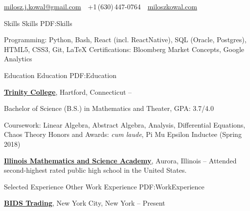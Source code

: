 \documentclass[letterpaper,MMMyyyy,nonstopmode]{simpleresumecv}
\newcommand{\CVAuthor}{Milosz Kowal}
\newcommand{\CVWebpage}{https://miloszkowal.com}
\begin{document}

\Title{\CVAuthor}

\begin{SubTitle}
\par
\href{mailto:milosz.j.kowal@gmail.com}
{milosz.j.kowal@gmail.com}
\,\SubBulletSymbol\,
+1\,(630)\,447-0764
\,\SubBulletSymbol\,
\href{\CVWebpage}
{miloszkowal.com}
\end{SubTitle}

\begin{Body}


\Section
{Skills}
{Skills}
{PDF:Skills}

\Entry
Programming: Python, Bash, React (incl. ReactNative), SQL (Oracle, Postgres), HTML5, CSS3, Git, \LaTeX{} \hfill\break{}
Certifications: Bloomberg Market Concepts, Google Analytics


\hrulefill
\Section
{Education}
{Education}
{PDF:Education}

\Entry
\href{http://www.trincoll.edu}
{\textbf{Trinity College}},
Hartford, Connecticut
\hfill
{} --

\Gap
\BulletItem
Bachelor of Science (B.S.) in
Mathematics and Theater, GPA: 3.7/4.0
\begin{Detail}
\SubBulletItem
Coursework: Linear Algebra, Abstract Algebra, Analysis, Differential Equations, Chaos Theory
\SubBulletItem
Honors and Awards: \textit{cum laude}, Pi Mu Epsilon Inductee (Spring 2018)
\end{Detail}

\BigGap
\Entry
\href{http://www.imsa.edu}
{\textbf{Illinois Mathematics and Science Academy}},
Aurora, Illinois
\hfill
{} --
\Gap
\BulletItem
Attended second-highest rated public high school in the United States.


\hrulefill
\Section
{Selected\newline
Experience}
{Other Work Experience}
{PDF:WorkExperience}

\Entry
\href{https://www.bidstrading.com/}
{\textbf{BIDS Trading}},
New York City, New York
\hfill
{} --
Present


\end{Body}
\end{document}
